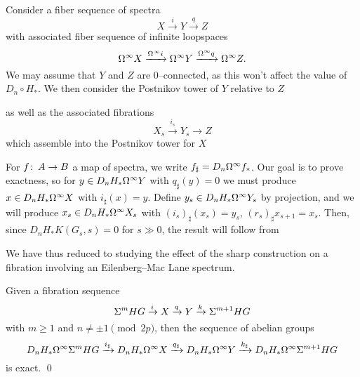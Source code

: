 Consider a fiber sequence of spectra \[X \xrightarrow i Y \xrightarrow q Z\] with associated fiber sequence of infinite loopspaces \[\Omega^\infty X \xrightarrow{\Omega^\infty i} \Omega^\infty Y \xrightarrow{\Omega^\infty q} \Omega^\infty Z.\]  We may assume that $Y$ and $Z$ are $0$--connected, as this won't affect the value of $D_n \circ H_*$.  We then consider the Postnikov tower of $Y$ relative to $Z$
\begin{center}
\end{center}
as well as the associated fibrations \[X_s \xrightarrow{i_s} Y_s \to Z\] which assemble into the Postnikov tower for $X$
\begin{center}
\end{center}

For $f\colon\thinspace A \to B$ a map of spectra, we write $f_\sharp = D_n \Omega^\infty f_*$.  Our goal is to prove exactness, so for $y \in D_n H_* \Omega^\infty Y$ with $q_\sharp(y) = 0$ we must produce $x \in D_n H_* \Omega^\infty X$ with $i_\sharp(x) = y$.  Define $y_s \in D_n H_* \Omega^\infty Y_s$ by projection, and we will produce $x_s \in D_n H_* \Omega^\infty X_s$ with $(i_s)_\sharp(x_s) = y_s$, $(r_s)_\sharp x_{s+1} = x_s$.  Then, since $D_n H_* K(G_s, s) = 0$ for $s \gg 0$, the result will follow from
\begin{center}
\end{center}
We have thus reduced to studying the effect of the sharp construction on a fibration involving an Eilenberg--Mac Lane spectrum.

\begin{lemma}
Given a fibration sequence \[\Sigma^m HG \xrightarrow i X \xrightarrow q Y \xrightarrow k \Sigma^{m+1} HG\] with $m \ge 1$ and $n \ne \pm 1 \pmod{2p}$, then the sequence of abelian groups \[D_n H_* \Omega^\infty \Sigma^m HG \xrightarrow{i_\sharp} D_n H_* \Omega^\infty X \xrightarrow{q_\sharp} D_n H_* \Omega^\infty Y \xrightarrow{k_\sharp} D_n H_* \Omega^\infty \Sigma^{m+1} HG\] is exact. \qed
\end{lemma}

